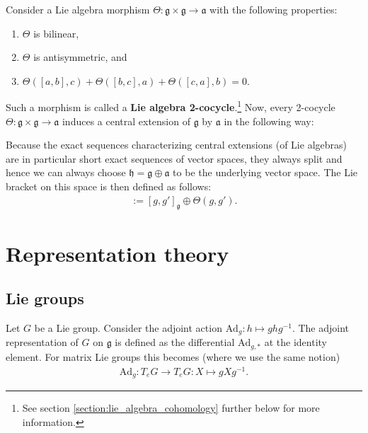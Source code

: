     \begin{construct}
        Consider a Lie algebra morphism $\Theta:\mathfrak{g}\times\mathfrak{g}\rightarrow\mathfrak{a}$ with the following properties:
        \begin{enumerate}
            \item $\Theta$ is bilinear,
            \item $\Theta$ is antisymmetric, and
            \item $\Theta([a,b], c) + \Theta([b,c], a) + \Theta([c,a], b) = 0$.
        \end{enumerate}
        Such a morphism is called a \textbf{Lie algebra 2-cocycle}.\footnote{See section \ref{section:lie_algebra_cohomology} further below for more information.} Now, every 2-cocycle $\Theta:\mathfrak{g}\times\mathfrak{g}\rightarrow\mathfrak{a}$ induces a central extension of $\mathfrak{g}$ by $\mathfrak{a}$ in the following way:

        \qquad Because the exact sequences characterizing central extensions (of Lie algebras) are in particular short exact sequences of vector spaces, they always split and hence we can always choose $\mathfrak{h}=\mathfrak{g}\oplus\mathfrak{a}$ to be the underlying vector space. The Lie bracket on this space is then defined as follows:
        \begin{gather}
            [g\oplus\lambda,g'\oplus\mu] := [g,g']_{\mathfrak{g}} \oplus \Theta(g,g').
        \end{gather}
    \end{construct}

\section{Representation theory}
\subsection{Lie groups}


    \begin{example}\label{lie:adjoint_representation}
        Let $G$ be a Lie group. Consider the adjoint action $\text{Ad}_g:h\mapsto ghg^{-1}$. The adjoint representation of $G$ on $\mathfrak{g}$ is defined as the differential $\text{Ad}_{g,*}$ at the identity element. For matrix Lie groups this becomes (where we use the same notion)
        \begin{gather}
            \text{Ad}_g:T_eG\rightarrow T_eG:X\mapsto gXg^{-1}.
        \end{gather}
    \end{example}

